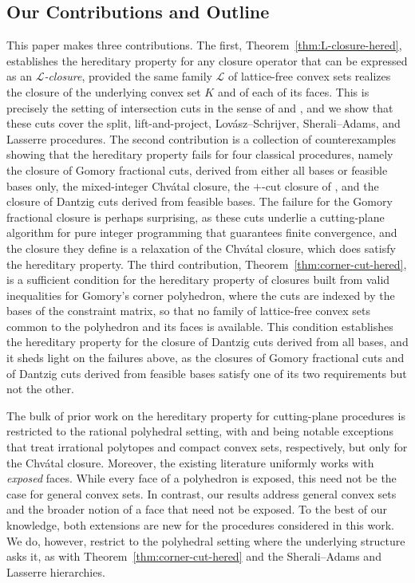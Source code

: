 \documentclass{article}
\renewcommand{\L}{\mathcal{L}}
\begin{document}
\subsection{Our Contributions and Outline} \label{subsec:contributions-outline}

This paper makes three contributions. The first, Theorem~\ref{thm:L-closure-hered}, establishes the hereditary property for any closure operator that can be expressed as an \emph{$\L$-closure}, provided the same family $\L$ of lattice-free convex sets realizes the closure of the underlying convex set $K$ and of each of its faces. This is precisely the setting of intersection cuts in the sense of \cite{balas1971intersection} and \cite{averkov2012finitely}, and we show that these cuts cover the split, lift-and-project, Lov\'asz--Schrijver, Sherali--Adams, and Lasserre procedures. The second contribution is a collection of counterexamples showing that the hereditary property fails for four classical procedures, namely the closure of Gomory fractional cuts, derived from either all bases or feasible bases only, the mixed-integer Chv\'atal closure, the $+$-cut closure of \cite{pokutta2010rank}, and the closure of Dantzig cuts derived from feasible bases. The failure for the Gomory fractional closure is perhaps surprising, as these cuts underlie a cutting-plane algorithm for pure integer programming that guarantees finite convergence, and the closure they define is a relaxation of the Chv\'atal closure, which does satisfy the hereditary property. The third contribution, Theorem~\ref{thm:corner-cut-hered}, is a sufficient condition for the hereditary property of closures built from valid inequalities for Gomory's corner polyhedron, where the cuts are indexed by the bases of the constraint matrix, so that no family of lattice-free convex sets common to the polyhedron and its faces is available. This condition establishes the hereditary property for the closure of Dantzig cuts derived from all bases, and it sheds light on the failures above, as the closures of Gomory fractional cuts and of Dantzig cuts derived from feasible bases satisfy one of its two requirements but not the other.

The bulk of prior work on the hereditary property for cutting-plane procedures is restricted to the rational polyhedral setting, with \cite{dunkel2013gomory} and \cite{dadush2014chvatal} being notable exceptions that treat irrational polytopes and compact convex sets, respectively, but only for the Chv\'atal closure. Moreover, the existing literature uniformly works with \emph{exposed} faces. While every face of a polyhedron is exposed, this need not be the case for general  convex sets. In contrast, our results address general convex sets and the broader notion of a face that need not be exposed. To the best of our knowledge, both extensions are new for the procedures considered in this work. We do, however, restrict to the polyhedral setting where the underlying structure asks it, as with Theorem~\ref{thm:corner-cut-hered} and the Sherali--Adams and Lasserre hierarchies.
\end{document}
